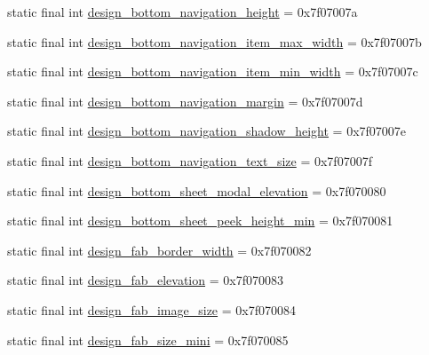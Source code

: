 \begin{CompactItemize}
\item 
static final int \hyperlink{classandroid_1_1support_1_1fragment_1_1_r_1_1dimen_2d4fa268e2a499aaab738fbfd590149f}{design\_\-bottom\_\-navigation\_\-height} = 0x7f07007a
\item 
static final int \hyperlink{classandroid_1_1support_1_1fragment_1_1_r_1_1dimen_9a863bdd83d8acad5c1abecc72c1e609}{design\_\-bottom\_\-navigation\_\-item\_\-max\_\-width} = 0x7f07007b
\item 
static final int \hyperlink{classandroid_1_1support_1_1fragment_1_1_r_1_1dimen_975e25816d861d32fcd448540c173e83}{design\_\-bottom\_\-navigation\_\-item\_\-min\_\-width} = 0x7f07007c
\item 
static final int \hyperlink{classandroid_1_1support_1_1fragment_1_1_r_1_1dimen_1e7ed76693e4f7d99b03de65ae174b24}{design\_\-bottom\_\-navigation\_\-margin} = 0x7f07007d
\item 
static final int \hyperlink{classandroid_1_1support_1_1fragment_1_1_r_1_1dimen_c6110aa2008718064ed44ef13f606964}{design\_\-bottom\_\-navigation\_\-shadow\_\-height} = 0x7f07007e
\item 
static final int \hyperlink{classandroid_1_1support_1_1fragment_1_1_r_1_1dimen_03cfa9cc73ce6f5d6b455a873e2cd02d}{design\_\-bottom\_\-navigation\_\-text\_\-size} = 0x7f07007f
\item 
static final int \hyperlink{classandroid_1_1support_1_1fragment_1_1_r_1_1dimen_9c9cf97dee382a72eaf91fcf9b93f51f}{design\_\-bottom\_\-sheet\_\-modal\_\-elevation} = 0x7f070080
\item 
static final int \hyperlink{classandroid_1_1support_1_1fragment_1_1_r_1_1dimen_fff8bd0b7602dc5e0eca3a6aa250bf55}{design\_\-bottom\_\-sheet\_\-peek\_\-height\_\-min} = 0x7f070081
\item 
static final int \hyperlink{classandroid_1_1support_1_1fragment_1_1_r_1_1dimen_86f23172f87bdc0665fbb0ef2da04044}{design\_\-fab\_\-border\_\-width} = 0x7f070082
\item 
static final int \hyperlink{classandroid_1_1support_1_1fragment_1_1_r_1_1dimen_fda8a5d4ef74748d7db324c5818ea304}{design\_\-fab\_\-elevation} = 0x7f070083
\item 
static final int \hyperlink{classandroid_1_1support_1_1fragment_1_1_r_1_1dimen_347b70e7a125be69025551956364d711}{design\_\-fab\_\-image\_\-size} = 0x7f070084
\item 
static final int \hyperlink{classandroid_1_1support_1_1fragment_1_1_r_1_1dimen_74cf9b0117f037afe99176cbb5d9540a}{design\_\-fab\_\-size\_\-mini} = 0x7f070085
\item 

\end{CompactItemize}
